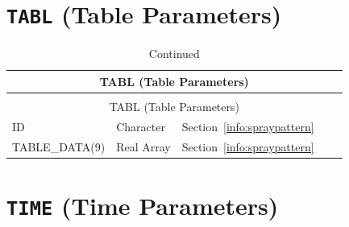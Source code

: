 \documentclass[11pt]{book}
\begin{document}

\vspace{\baselineskip}


\section{\texorpdfstring{{\tt TABL}}{TABL} (Table Parameters)}


\begin{longtable}{@{\extracolsep{\fill}}|l|l|l|l|l|}
\caption[Table parameters ({\ct TABL} namelist group)]{For more information see Section~\ref{info:spraypattern}.}
\label{tbl:TABL} \\
\hline
\multicolumn{5}{|c|}{{\ct TABL} (Table Parameters)} \\
\hline \hline
\endfirsthead
\caption[]{Continued} \\
\hline
\multicolumn{5}{|c|}{{\ct TABL} (Table Parameters)} \\
\hline \hline
\endhead
{\ct ID}                & Character   & Section~\ref{info:spraypattern}      &             &     \\ \hline
{\ct TABLE\_DATA(9)}    & Real Array  & Section~\ref{info:spraypattern}      &             &     \\ \hline
\end{longtable}


\vspace{\baselineskip}


\section{\texorpdfstring{{\tt TIME}}{TIME} (Time Parameters)}
\end{document}
